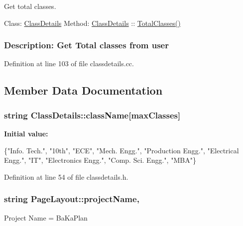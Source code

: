 Get total classes. 



 Class\-: \hyperlink{classClassDetails}{Class\-Details} Method\-: \hyperlink{classClassDetails}{Class\-Details} \-:\-: \hyperlink{classClassDetails_a2a63d68979d3ac96d35e6534414799ef}{Total\-Classes()} \subsubsection*{Description\-: Get Total classes from user}

Definition at line 103 of file classdetails.\-cc.



\subsection{Member Data Documentation}
\hypertarget{classClassDetails_a493e8ed1abcf67813875cff05c2a4543}{
\subsubsection[{class\-Name}]{\setlength{\rightskip}{0pt plus 5cm}string Class\-Details\-::class\-Name\mbox{[}max\-Classes\mbox{]}\hspace{0.3cm}{\ttfamily [protected]}}}\label{classClassDetails_a493e8ed1abcf67813875cff05c2a4543}
{\bfseries Initial value\-:}
\begin{DoxyCode}
 \{\textcolor{stringliteral}{"Info. Tech."}, \textcolor{stringliteral}{"10th"}, 
                                        \textcolor{stringliteral}{"ECE"}, \textcolor{stringliteral}{"Mech. Engg."}, 
                                        \textcolor{stringliteral}{"Production Engg."}, 
                                        \textcolor{stringliteral}{"Electrical Engg."}, \textcolor{stringliteral}{"IT"},             
                                        \textcolor{stringliteral}{"Electronics Engg."}, 
                                        \textcolor{stringliteral}{"Comp. Sci. Engg."}, \textcolor{stringliteral}{"MBA"}\}
\end{DoxyCode}


Definition at line 54 of file classdetails.\-h.

\hypertarget{classPageLayout_a8a3c1ddc422df2556fbc95d0cd575a05}{
\subsubsection[{project\-Name}]{\setlength{\rightskip}{0pt plus 5cm}string Page\-Layout\-::project\-Name\hspace{0.3cm}{\ttfamily [protected]}, {\ttfamily [inherited]}}}\label{classPageLayout_a8a3c1ddc422df2556fbc95d0cd575a05}
Project Name = Ba\-Ka\-Plan 

